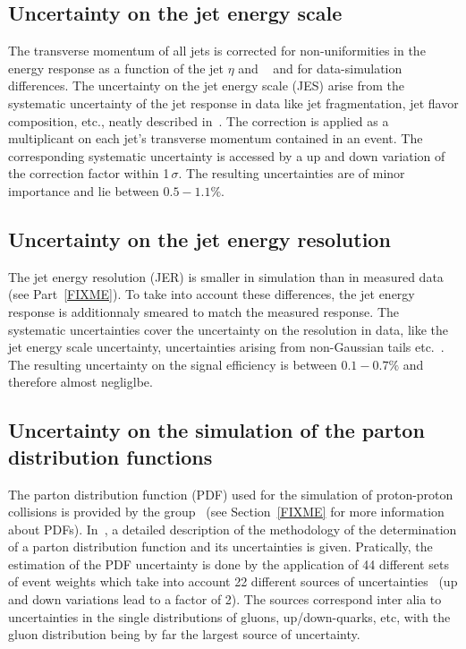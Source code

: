 \subsection*{Uncertainty on the jet energy scale}
The transverse momentum of all jets is corrected for non-uniformities in the energy response as a function of the jet $\eta$ and \pt~\cite{bib:CMS:JME_PAS} and for data-simulation differences.
The uncertainty on the jet energy scale (JES) arise from the systematic uncertainty of the jet response in data like jet fragmentation, jet flavor composition, etc., neatly described in~\cite{bib:CMS:JME_PAS}.
The correction is applied as a multiplicant on each jet's transverse momentum contained in an event.
The corresponding systematic uncertainty is accessed by a up and down variation of the correction factor within 1\,$\sigma$.
The resulting uncertainties are of minor importance and lie between $0.5-1.1\%$.

\subsection*{Uncertainty on the jet energy resolution}
The jet energy resolution (JER) is smaller in simulation than in measured data (see Part~\ref{FIXME}). 
To take into account these differences, the jet energy response is additionnaly smeared to match the measured response.
The systematic uncertainties cover the uncertainty on the resolution in data, like the jet energy scale uncertainty, uncertainties arising from non-Gaussian tails etc.~\cite{bib:CMS:JME_PAS,bib:Kristin_Thesis}.
The resulting uncertainty on the signal efficiency is between $0.1-0.7\%$ and therefore almost negliglbe.

\subsection*{Uncertainty on the simulation of the parton distribution functions}
The parton distribution function (PDF) used for the simulation of proton-proton collisions is provided by the \cteq group~\cite{Pumplin:2002vw} (see Section~\ref{FIXME} for more information about PDFs).
In~\cite{Pumplin:2002vw}, a detailed description of the methodology of the determination of a parton distribution function and its uncertainties is given.
Pratically, the estimation of the PDF uncertainty is done by the application of 44 different sets of event weights which take into account 22 different sources of uncertainties~\cite{Botje:2011sn,bib:PDF_practical} 
(up and down variations lead to a factor of 2).
The sources correspond inter alia to uncertainties in the single distributions of gluons, up/down-quarks, etc, with the gluon distribution being by far the largest source of uncertainty.

